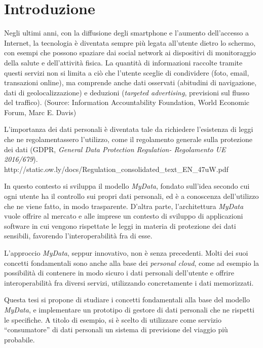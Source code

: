 \chapter{Introduzione}
\label{Introduzione}
\thispagestyle{empty}

\noindent Negli ultimi anni, con la diffusione degli smartphone e l’aumento dell’accesso a Internet, la tecnologia \`e diventata sempre pi\`u legata all’utente dietro lo schermo, con esempi che possono spaziare dai social network ai dispositivi di monitoraggio della salute e dell’attivit\`a fisica. La quantit\`a di informazioni raccolte tramite questi servizi non si limita a ci\`o che l’utente sceglie di condividere (foto, email, transazioni online), ma comprende anche dati osservati (abitudini di navigazione, dati di geolocalizzazione) e deduzioni (\textit{targeted advertising}, previsioni sul flusso del traffico). (Source: Information Accountability Foundation, World Economic Forum, Marc E. Davis) \cite{wefreport}

L’importanza dei dati personali \`e diventata tale da richiedere l’esistenza di leggi che ne regolamentassero l’utilizzo, come il regolamento generale sulla protezione dei dati (GDPR, \textit{General Data Protection Regulation- Regolamento UE 2016/679}). http://static.ow.ly/docs/Regulation\_consolidated\_text\_EN\_47uW.pdf 

In questo contesto si sviluppa il modello \textit{MyData}, fondato sull’idea secondo cui ogni utente ha il controllo sui propri dati personali, ed \`e a conoscenza dell’utilizzo che ne viene fatto, in modo trasparente. D’altra parte, l’architettura \textit{MyData} vuole offrire al mercato e alle imprese un contesto di sviluppo di applicazioni software in cui vengono rispettate le leggi in materia di protezione dei dati sensibili, favorendo l’interoperabilit\`a fra di esse.

L’approccio \textit{MyData}, seppur innovativo, non \`e senza precedenti. Molti dei suoi concetti fondamentali sono anche alla base dei \textit{personal cloud}, come ad esempio la possibilit\`a di contenere in modo sicuro i dati personali dell’utente e offrire interoperabilit\`a fra diversi servizi, utilizzando concretamente i dati memorizzati.

Questa tesi si propone di studiare i concetti fondamentali alla base del modello \textit{MyData}, e implementare un prototipo di gestore di dati personali che ne rispetti le specifiche.
A titolo di esempio, si \`e scelto di utilizzare come servizio “consumatore” di dati personali un sistema di previsione del viaggio pi\`u probabile.


